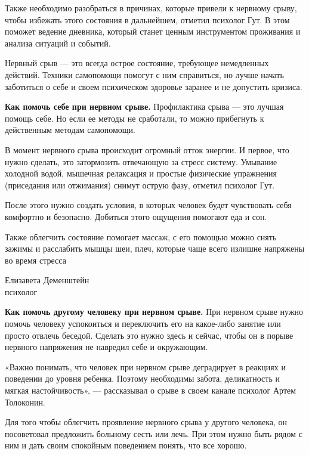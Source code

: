 Также необходимо разобраться в причинах, которые привели к нервному срыву, чтобы избежать этого состояния в дальнейшем, отметил психолог Гут. В этом поможет ведение дневника, который станет ценным инструментом проживания и анализа ситуаций и событий.

Нервный срыв  ---  это всегда острое состояние, требующее немедленных действий. Техники самопомощи помогут с ним справиться, но лучше начать заботиться о себе и своем психическом здоровье заранее и не допустить кризиса.

\textbf{Как помочь себе при нервном срыве.}
Профилактика срыва  ---  это лучшая помощь себе. Но если ее методы не сработали, то можно прибегнуть к действенным методам самопомощи.

В момент нервного срыва происходит огромный отток энергии. И первое, что нужно сделать, это затормозить отвечающую за стресс систему. Умывание холодной водой, мышечная релаксация и простые физические упражнения (приседания или отжимания) снимут острую фазу, отметил психолог Гут.

После этого нужно создать условия, в которых человек будет чувствовать себя комфортно и безопасно. Добиться этого ощущения помогают еда и сон.

\begin{fancyquotes}
    Также облегчить состояние помогает массаж, с его помощью можно снять зажимы и расслабить мышцы шеи, плеч, которые чаще всего излишне напряжены во время стресса\\

    \begin{flushright}
        Елизавета Деменштейн\\психолог
    \end{flushright}
\end{fancyquotes}

\textbf{Как помочь другому человеку при нервном срыве.}
При нервном срыве нужно помочь человеку успокоиться и переключить его на какое-либо занятие или просто отвлечь беседой. Сделать это нужно здесь и сейчас, чтобы он в порыве нервного напряжения не навредил себе и окружающим.

«Важно понимать, что человек при нервном срыве деградирует в реакциях и поведении до уровня ребенка. Поэтому необходимы забота, деликатность и мягкая настойчивость»,  ---  рассказывал о срыве в своем канале психолог Артем Толоконин.

Для того чтобы облегчить проявление нервного срыва у другого человека, он посоветовал предложить больному сесть или лечь. При этом нужно быть рядом с ним и дать своим спокойным поведением понять, что все хорошо.

